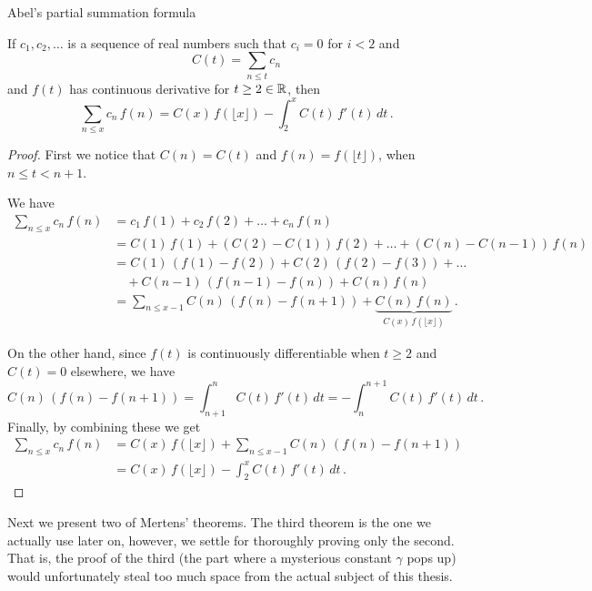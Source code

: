\documentclass{article}
\begin{document}
\begin{lemma}
\label{lemma:abelsum}
Abel's partial summation formula \emph{\cite{HardyWright}}

If $c_1, c_2,\dots$ is a sequence of real numbers such that $c_i=0$ for $i<2$ and
\begin{equation*}
    C(t) = \sum_{n\leq t} c_n
\end{equation*}
and $f(t)$ has continuous derivative for $t \geq 2 \in \mathbb{R}$, then
\begin{equation*}
    \sum_{n\leq x} c_n\,f(n) = C(x)\,f(\lfloor x\rfloor)-\int_2^x C(t)\,f'(t)\,dt\,.
\end{equation*}

\begin{proof}
First we notice that $C(n) = C(t)$ and $f(n)=f(\lfloor t\rfloor)$, when $n\leq t < n+1$.

We have
\begin{align*}
    \sum_{n\leq x} c_n\,f(n) & = c_1\,f(1) + c_2\,f(2) + \dots + c_n\,f(n)\\
    & =  C(1)\,f(1) + (C(2)-C(1))\,f(2) + \dots + (C(n)-C(n-1))\,f(n)\\
    & = C(1)\,(f(1)-f(2)) + C(2)\,(f(2)-f(3)) + \dots\\
    & \quad + C(n-1)\,(f(n-1)-f(n)) + C(n)\,f(n)\\
    & = \sum_{n\leq x-1} C(n)\,(f(n)-f(n+1)) + \underbrace{C(n)\,f(n)}_\text{$C(x)\,f(\lfloor x\rfloor)$}\,.
\end{align*}

On the other hand, since $f(t)$ is continuously differentiable when $t\geq2$ and $C(t)=0$ elsewhere, we have
\begin{equation*}
     C(n)\,(f(n)-f(n+1)) = \int_{n+1}^n C(t)\,f'(t)\,dt = -\int_n^{n+1} C(t)\,f'(t)\,dt\,.
\end{equation*}
Finally, by combining these we get
\begin{align*}
    \sum_{n\leq x} c_n\,f(n) & = C(x)\,f(\lfloor x\rfloor) + \sum_{n\leq x-1} C(n)\,(f(n)-f(n+1))\\
    & = C(x)\,f(\lfloor x\rfloor)-\int_2^x C(t)\,f'(t)\,dt\,.
\end{align*}

\end{proof}
\end{lemma}

Next we present two of Mertens' theorems. The third theorem is the one we actually use later on, however, we settle for thoroughly proving only the second. That is, the proof of the third (the part where a mysterious constant $\gamma$ pops up) would unfortunately steal too much space from the actual subject of this thesis.
\end{document}
